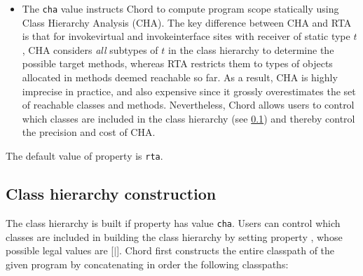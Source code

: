 \begin{itemize}
\item
The {\tt cha} value instructs Chord to compute program scope
statically using Class Hierarchy Analysis (CHA).
The key difference between CHA and RTA is that for invokevirtual and
invokeinterface sites with receiver of static type $t$, CHA considers
{\it all} subtypes of $t$ in the class hierarchy to determine the
possible target methods, whereas RTA restricts them to types of
objects allocated in methods deemed reachable so far.  As a result,
CHA is highly imprecise in practice, and also expensive since it
grossly overestimates the set of reachable classes and methods.
Nevertheless, Chord allows users to control which classes are
included in the class hierarchy (see \ref{sec:cha}) and thereby control the
precision and cost of CHA.

\end{itemize}
The default value of property  is {\tt rta}.

\subsection{Class hierarchy construction}
\label{sec:cha}

The class hierarchy is built if property  has
value {\tt cha}.  Users can control which classes are included in
building the class hierarchy by setting property ,
whose possible legal values are [$|$].
Chord first constructs the entire classpath of the given program by
concatenating in order the following classpaths:

